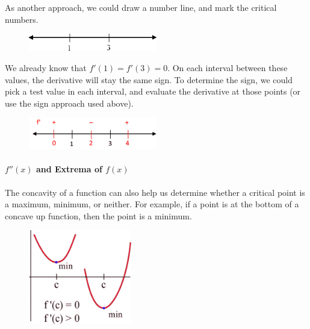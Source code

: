 \begin{example}
\begin{solution}
As another approach, we could draw a number line, and mark the critical numbers.
\begin{figure}[!ht]
  \centering
    \includegraphics[width=0.5\textwidth]{img/chap3/image109.png}
\end{figure}
We already know that $f'(1)=f'(3)=0$. On each interval between these values, the derivative will stay the same sign. To determine the sign, we could pick a test value in each interval, and evaluate the derivative at those points (or use the sign approach used above).
\begin{figure}[!ht]
  \centering
    \includegraphics[width=0.5\textwidth]{img/chap3/image110.png}
\end{figure}
\end{solution}
\end{example}

\paragraph*{$f''(x)$ and Extrema of $f(x)$}
The concavity of a function can also help us determine whether a critical point is a maximum, minimum, or neither. For example, if a point is at the bottom of a concave up function, then the point is a minimum.

\begin{figure}[!ht]
  \centering
    \includegraphics[width=0.4\textwidth]{img/chap3/image062.png}
\end{figure}

